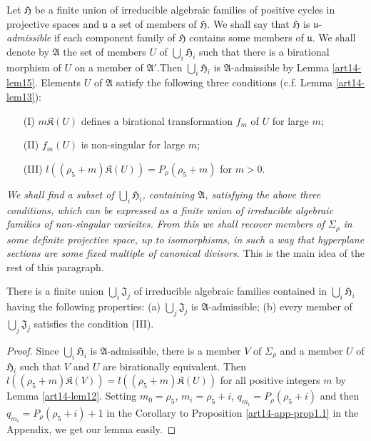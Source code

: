 Let $\mathfrak{H}$ be a finite union of irreducible algebraic families of positive cycles in projective spaces and $\mathfrak{u}$ a set of members of $\mathfrak{H}$. We shall say that $\mathfrak{H}$ is $\mathfrak{u}$-{\em admissible} if each component family of $\mathfrak{H}$ contains some members of $\mathfrak{u}$. We shall denote by $\mathfrak{A}$ the set of members $U$ of $\bigcup_{i}\mathfrak{H}_{i}$ such that there is a birational morphism of $U$ on a member of $\mathfrak{A}'$.\pageoriginale Then $\bigcup_{i}\mathfrak{H}_{i}$ is $\mathfrak{A}$-admissible by Lemma \ref{art14-lem15}. Elements $U$ of $\mathfrak{A}$ satisfy the following three conditions (c.f. Lemma \ref{art14-lem13}):
\begin{itemize}
\item[(I)] $m\mathfrak{K}(U)$ defines a birational transformation $f_{m}$ of $U$ for large $m$; 

\item[(II)] $f_{m}(U)$ is non-singular for large $m$;

\item[(III)] $l((\rho_{5}+m)\mathfrak{K}(U))=P_{\rho}(\rho_{5}+m)$ for $m>0$.
\end{itemize}
{\em We shall find a subset of $\bigcup_{i}\mathfrak{H}_{i}$, containing $\mathfrak{A}$, satisfying the above three conditions, which can be expressed as a finite union of irreducible algebraic families of non-singular varieites. From this we shall recover members of $\Sigma_{\rho}$ in some definite projective space, up to isomorphisms, in such a way that hyperplane sections are some fixed multiple of canonical divisors.} This is the main idea of the rest of this paragraph.

\begin{lemma}\label{art14-lem16}
There is a finite union $\bigcup_{i}\mathfrak{J}_{j}$ of irreducible algebraic families contained in $\bigcup_{i}\mathfrak{H}_{i}$ having the following properties: {\rm(a)} $\bigcup_{j}\mathfrak{J}_{j}$ is $\mathfrak{A}$-admissible; {\rm(b)} every member of $\bigcup_{j}\mathfrak{J}_{j}$ satisfies the condition {\rm(III)}.
\end{lemma}

\begin{proof}
Since $\bigcup_{i}\mathfrak{H}_{i}$ is $\mathfrak{A}$-admissible, there is a member $V$ of $\Sigma_{\rho}$ and a member $U$ of $\mathfrak{H}_{i}$ such that $V$ and $U$ are birationally equivalent. Then $l((\rho_{5}+m)\mathfrak{K}(V))=l((\rho_{5}+m)\mathfrak{K}(U))$ for all positive integers $m$ by Lemma \ref{art14-lem12}. Setting $m_{0}=\rho_{5}$, $m_{i}=\rho_{5}+i$, $q_{m_{i}}=P_{\rho}(\rho_{5}+i)$ and then $q_{m_{i}}=P_{\rho}(\rho_{5}+i)+1$ in the Corollary to Proposition \ref{art14-app-prop1.1} in the Appendix, we get our lemma easily.
\end{proof}


